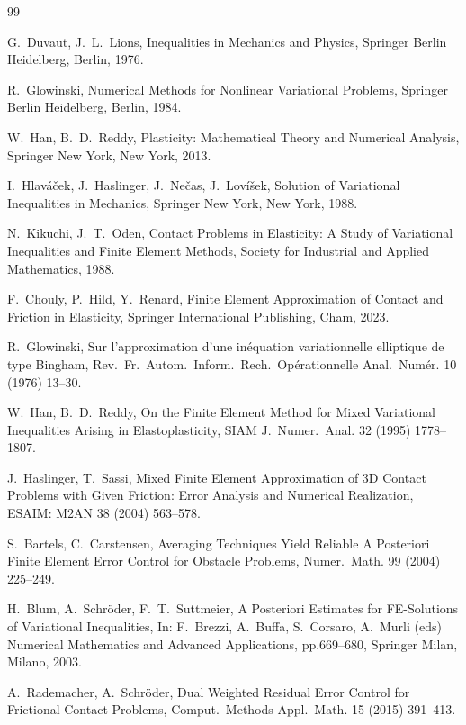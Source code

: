 \documentclass[12pt,twoside,reqno]{amsart}
\theoremstyle{definition}
\numberwithin{equation}{section}
\begin{document}
\begin{thebibliography}{99}%

 G.~Duvaut, J.~L.~Lions, Inequalities in Mechanics and Physics, Springer Berlin Heidelberg, Berlin, 1976.

 R.~Glowinski, Numerical Methods for Nonlinear Variational Problems, Springer Berlin Heidelberg, Berlin, 1984.

 W.~Han, B.~D.~Reddy, Plasticity: Mathematical Theory and Numerical Analysis, Springer New York, New York, 2013.

 I.~Hlaváček, J.~Haslinger, J.~Nečas, J.~Lovíšek, Solution of Variational Inequalities in Mechanics, Springer New York, New York, 1988.

 N.~Kikuchi, J.~T.~Oden, Contact Problems in Elasticity: A Study of Variational Inequalities and Finite Element Methods, Society for Industrial and Applied Mathematics, 1988.


 F.~Chouly, P.~Hild, Y.~Renard, Finite Element Approximation of Contact and Friction in Elasticity, Springer International Publishing, Cham, 2023.

 R.~Glowinski, Sur l'approximation d'une in\'equation variationnelle elliptique de type Bingham, Rev.~Fr.~Autom.~Inform.~Rech.~Op\'erationnelle Anal.~Num\'er. 10 (1976) 13--30.

 W.~Han, B.~D.~Reddy, On the Finite Element Method for Mixed Variational Inequalities Arising in Elastoplasticity, SIAM J.~Numer.~Anal. 32 (1995) 1778--1807.

 J.~Haslinger, T.~Sassi, Mixed Finite Element Approximation of 3D Contact Problems with Given Friction: Error Analysis and Numerical Realization, ESAIM: M2AN 38 (2004) 563--578.

 S.~Bartels, C.~Carstensen, Averaging Techniques Yield Reliable A Posteriori Finite Element Error Control for Obstacle Problems, Numer.~Math. 99 (2004) 225--249.

 H.~Blum, A.~Schröder, F.~T.~Suttmeier, A Posteriori Estimates for FE-Solutions of Variational Inequalities, In: F.~Brezzi, A.~Buffa, S.~Corsaro, A.~Murli (eds) Numerical Mathematics and Advanced Applications, pp.669--680, Springer Milan, Milano, 2003.

 A.~Rademacher, A.~Schröder, Dual Weighted Residual Error Control for Frictional Contact Problems, Comput.~Methods Appl.~Math. 15 (2015) 391--413.


\end{thebibliography}
\end{document}
